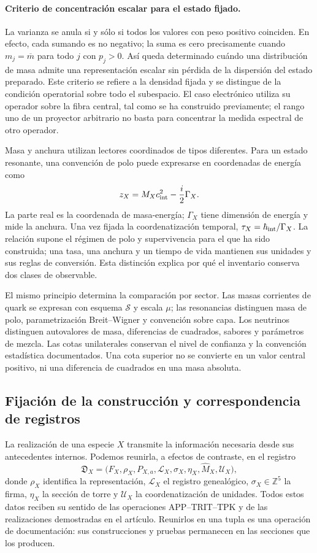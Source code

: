 \paragraph{Criterio de concentración escalar para el estado fijado.}
La varianza se anula si y sólo si todos los valores con peso positivo
coinciden. En efecto, cada sumando es no negativo; la suma es cero
precisamente cuando \(m_j=\overline m\) para todo \(j\) con
\(p_j>0\). Así queda determinado cuándo una distribución de masa admite
una representación escalar sin pérdida de la dispersión del estado preparado.
Este criterio se refiere a la densidad fijada y se distingue de la condición
operatorial sobre todo el subespacio. El caso electrónico utiliza su
operador sobre la fibra central, tal como se ha construido previamente;
el rango uno de un proyector arbitrario no basta para concentrar la medida
espectral de otro operador.

Masa y anchura utilizan lectores coordinados de tipos diferentes. Para un
estado resonante, una convención de polo puede expresarse en coordenadas de
energía como
\[
 z_X=M_Xc_{\rm int}^{2}-\frac{i}{2}\Gamma_X.
\]
La parte real es la coordenada de masa-energía; \(\Gamma_X\) tiene
dimensión de energía y mide la anchura. Una vez fijada la coordenatización temporal,
\(\tau_X=\hbar_{\rm int}/\Gamma_X\). La relación supone el régimen de
polo y supervivencia para el que ha sido construida; una tasa, una anchura y
un tiempo de vida mantienen sus unidades y sus reglas de conversión. Esta
distinción explica por qué el inventario conserva dos clases de observable.

El mismo principio determina la comparación por sector. Las masas corrientes
de quark se expresan con esquema \(\mathscr S\) y escala \(\mu\);
las resonancias distinguen masa de polo, parametrización Breit--Wigner y
convención sobre capa. Los neutrinos distinguen autovalores de masa,
diferencias de cuadrados, sabores y parámetros de mezcla. Las cotas
unilaterales conservan el nivel de confianza y la convención estadística
documentados. Una cota superior no se convierte en un valor central positivo,
ni una diferencia de cuadrados en una masa absoluta.

\subsection{Fijación de la construcción y correspondencia de registros}
\label{subsec:vi-congelacion}

La realización de una especie \(X\) transmite la información necesaria
desde sus antecedentes internos. Podemos reunirla, a efectos de contraste,
en el registro
\[
 \mathfrak D_X=
 \bigl(F_X,\rho_X,P_{X,a},\mathcal L_X,
       \sigma_X,\eta_X,\widehat M_X,\mathcal U_X\bigr),
\]
donde \(\rho_X\) identifica la representación, \(\mathcal L_X\) el
registro genealógico, \(\sigma_X\in\mathbb Z^5\) la firma,
\(\eta_X\) la sección de torre y \(\mathcal U_X\) la coordenatización de
unidades. Todos estos datos reciben su sentido de las operaciones
APP--TRIT--TPK y de las realizaciones demostradas en el artículo. Reunirlos
en una tupla es una operación de documentación: sus construcciones y
pruebas permanecen en las secciones que los producen.

